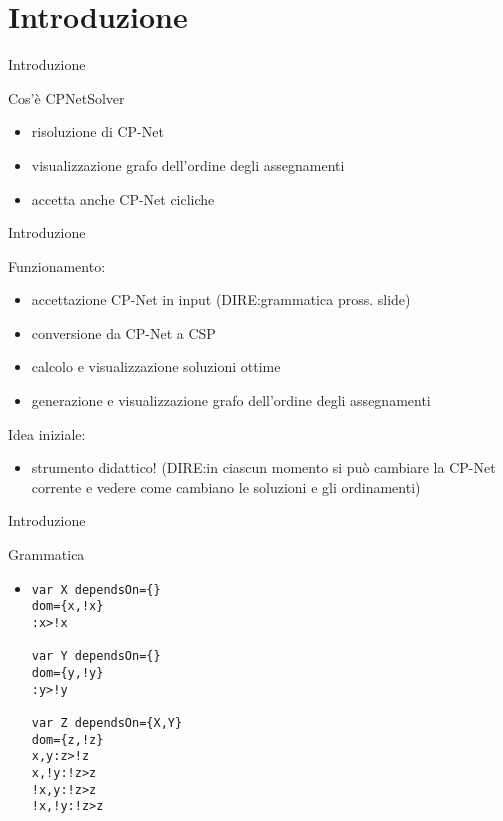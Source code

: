 \section{Introduzione}
\begin{frame}{Introduzione}

Cos'è CPNetSolver
\begin{itemize}
  \item risoluzione di CP-Net
  \item visualizzazione grafo dell'ordine degli assegnamenti
  \item accetta anche CP-Net cicliche
\end{itemize}
\end{frame}

\begin{frame}{Introduzione}

Funzionamento:
\begin{itemize}
  \item accettazione CP-Net in input (DIRE:grammatica pross. slide)
  \item conversione da CP-Net a CSP
  \item calcolo e visualizzazione soluzioni ottime
  \item generazione e visualizzazione grafo dell'ordine degli assegnamenti
\end{itemize}

Idea iniziale:
\begin{itemize}
  \item strumento didattico! (DIRE:in ciascun momento si può cambiare la CP-Net
  corrente e vedere come cambiano le soluzioni e gli ordinamenti)
  
\end{itemize}
\end{frame}

\begin{frame}[fragile]{Introduzione}

Grammatica
\begin{itemize}
\item
\begin{verbatim}
var X dependsOn={}
dom={x,!x}
:x>!x

var Y dependsOn={}
dom={y,!y}
:y>!y

var Z dependsOn={X,Y}
dom={z,!z}
x,y:z>!z
x,!y:!z>z
!x,y:!z>z
!x,!y:!z>z
\end{verbatim}
\end{itemize}
\end{frame}
